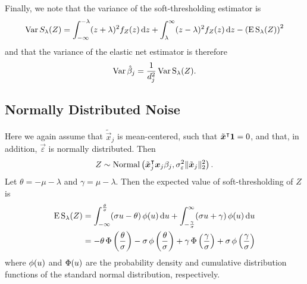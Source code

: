 Finally, we note that the variance of the soft-thresholding estimator is
\begin{equation}
  \label{eq:st-variance}
  \operatorname{Var} {S_\lambda(Z)} = \int_{-\infty}^{-\lambda}(z + \lambda)^2f_Z(z) \mathop{}\!\mathrm{d} z + \int_{\lambda}^\infty (z - \lambda)^2 f_Z(z) \mathop{}\!\mathrm{d} z - \left(\operatorname{E} \operatorname{S}_\lambda(Z)\right)^2
\end{equation}
and that the variance of the elastic net estimator is therefore
\begin{equation}
  \label{eq:betahat-variance}
  \operatorname{Var} \hat\beta_j = \frac{1}{d_j^2} \operatorname{Var} \operatorname{S}_\lambda(Z).
\end{equation}

\subsection{Normally Distributed Noise}

Here we again assume that \(\tilde{\vec{x}}_j\) is mean-centered, such that \(\tilde{\boldsymbol{x}}^\intercal \boldsymbol{1} = 0\), and that, in addition, \(\vec{\varepsilon}\) is normally distributed. Then
\[
  Z \sim \operatorname{Normal}\left(\tilde{\boldsymbol{x}}_j^\intercal\boldsymbol{x}_j \beta_j, \sigma_\varepsilon^2 \lVert \tilde{\boldsymbol{x}}_j\rVert_2^2 \right).
\]
Let \(\theta = -\mu -\lambda \) and \(\gamma = \mu - \lambda\). Then the expected value of soft-thresholding of \(Z\) is
\begin{align}
  \operatorname{E} \operatorname{S}_\lambda(Z) & = \int_{-\infty}^\frac{\theta}{\sigma} (\sigma u - \theta) \operatorname{\phi}(u) \mathop{}\!\mathrm{d} u + \int_{-\frac{\gamma}{\sigma}}^\infty (\sigma u + \gamma) \operatorname{\phi}(u) \mathop{}\!\mathrm{d} u                                               \nonumber                      \\
                    & = -\theta \operatorname{\Phi}\left(\frac{\theta}{\sigma}\right) - \sigma \operatorname{\phi}\left(\frac{\theta}{\sigma}\right) + \gamma \operatorname{\Phi}\left(\frac{\gamma}{\sigma}\right) + \sigma \operatorname{\phi}\left(\frac{\gamma}{\sigma}\right) \label{eq:mean-centered-eval}
\end{align}
where \(\operatorname{\phi}(u)\) and \(\operatorname{\Phi}(u)\) are the probability density and cumulative distribution functions of the standard normal distribution, respectively.

